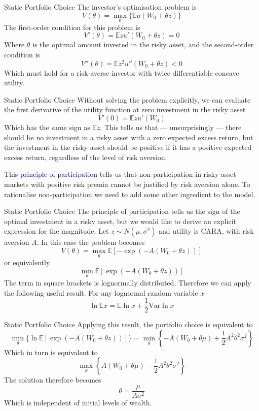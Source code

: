 \documentclass[aspectratio=169,xcolor=dvipsnames]{beamer}
\begin{document}
\begin{frame}{Static Portfolio Choice}
    The investor's optimisation problem is
    \[
        V(\theta) = \max_\theta \{\mathbb{E} u(W_0 + \theta z)\}
    \]
    The first-order condition for this problem is
    \[
        V'(\theta) = \mathbb{E} z u'(W_0 + \theta z) = 0
    \]
    Where $\theta$ is the optimal amount invested in the risky asset, and the second-order condition is
    \[
        V''(\theta) = \mathbb{E} z^2 u''(W_0 + \theta z) < 0
    \]
    Which must hold for a risk-averse investor with twice differentiable concave utility.
\end{frame}

\begin{frame}{Static Portfolio Choice}
    Without solving the problem explicitly, we can evaluate the first derivative of the utility function at zero investment in the risky asset
    \[
        V'(0) = \mathbb{E} z u'(W_0)
    \]
    Which has the same sign as $\mathbb{E} z$. This tells us that --- unsurprisingly --- there should be no investment in a risky asset with a zero expected excess return, but the investment in the risky asset should be positive if it has a positive expected excess return, regardless of the level of risk aversion.

    This \textcolor{darkblue}{principle of participation} tells us that non-participation in risky asset markets with positive risk premia cannot be justified by risk aversion alone. To rationalise non-participation we need to add some other ingredient to the model.
\end{frame}

\begin{frame}{Static Portfolio Choice}
    The principle of participation tells us the sign of the optimal investment in a risky asset, but we would like to derive an explicit expression for the magnitude. Let $z \sim N(\mu, \sigma^2)$ and utility is CARA, with risk aversion $A$. In this case the problem becomes
    \[
        V(\theta) = \max_\theta \mathbb{E}[-\exp(-A(W_0 + \theta z))]
    \]
    or equivalently
    \[
        \min_\theta \mathbb{E}[\exp(-A(W_0 + \theta z))]
    \]
    The term in square brackets is lognormally distributed. Therefore we can apply the following useful result. For any lognormal random variable $x$
    \[
        \ln \mathbb{E} x = \mathbb{E} \ln x + \frac{1}{2} \mathrm{Var} \ln x
    \]
\end{frame}

\begin{frame}{Static Portfolio Choice}
    Applying this result, the portfolio choice is equivalent to
    \[
        \min_\theta \{\ln \mathbb{E} [\exp(-A(W_0 + \theta z))]\} = \min_\theta \left\{-A(W_0 + \theta \mu) + \frac{1}{2} A^2 \theta^2 \sigma^2\right\}
    \]
    Which in turn is equivalent to
    \[
        \max_\theta \left\{A(W_0 + \theta \mu) - \frac{1}{2} A^2 \theta^2 \sigma^2\right\}
    \]
    The solution therefore becomes
    \[
        \theta = \frac{\mu}{A \sigma^2}
    \]
    Which is independent of initial levels of wealth.
\end{frame}
\end{document}
